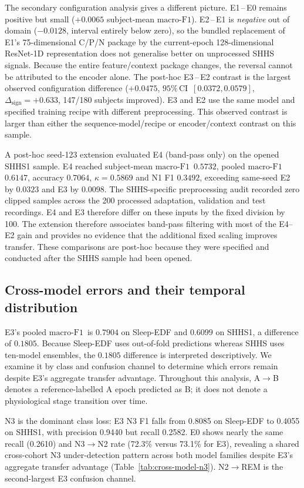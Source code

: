 \documentclass[11pt,a4paper]{article}
\newcommand{\mf}{\ensuremath{\mathrm{macro\text{-}F1}}}
\newcommand{\ci}{\ensuremath{95\%\,\mathrm{CI}}}
\newcommand{\dsign}{\ensuremath{\Delta_{\mathrm{sign}}}}
\begin{document}
The secondary configuration analysis gives a different picture. E1\,--\,E0 remains positive but small
($+0.0065$ subject-mean \mf). E2\,--\,E1 is \emph{negative} out of domain
($-0.0128$, interval entirely below zero),
so the bundled replacement of E1's 75-dimensional C/P/N package by the current-epoch 128-dimensional
ResNet-1D representation does not generalise better on unprocessed SHHS signals. Because the entire
feature/context package changes, the reversal cannot be attributed to the encoder alone. The
post-hoc E3\,--\,E2 contrast is the largest observed
configuration difference ($+0.0475$, \ci\ $[0.0372,0.0579]$, $\dsign = +0.633$, 147/180 subjects
improved). E3 and E2 use the same model and specified training recipe with different preprocessing.
This observed contrast is larger than either the sequence-model/recipe or encoder/context contrast
on this sample.

A post-hoc seed-123 extension evaluated E4 (band-pass only) on the opened SHHS1 sample. E4
reached subject-mean \mf\ $0.5732$, pooled \mf\ $0.6147$, accuracy $0.7064$, $\kappa = 0.5869$ and N1
F1 $0.3492$, exceeding same-seed E2 by $0.0323$ and E3 by $0.0098$. The SHHS-specific preprocessing
audit recorded zero clipped samples across the 200 processed adaptation, validation and test recordings.
E4 and E3 therefore differ on these inputs by the fixed division by 100.
The extension therefore associates band-pass filtering with most of the E4--E2 gain and provides no
evidence that the additional fixed scaling improves transfer. These comparisons are post-hoc because
they were specified and conducted after the SHHS sample had been opened.

\FloatBarrier
\subsection{Cross-model errors and their temporal distribution}
\label{sec:gap}

E3's pooled \mf\ is $0.7904$ on Sleep-EDF and $0.6099$ on SHHS1, a difference of $0.1805$.
Because Sleep-EDF uses out-of-fold predictions whereas SHHS uses ten-model ensembles, the $0.1805$
difference is interpreted descriptively. We examine it by class and confusion channel to
determine which errors remain despite E3's aggregate transfer advantage. Throughout this analysis,
A$\rightarrow$B denotes a reference-labelled A epoch predicted as B; it does not denote a physiological
stage transition over time.

N3 is the dominant class loss: E3 N3 F1 falls from 0.8085 on Sleep-EDF to 0.4055 on SHHS1, with
precision 0.9440 but recall 0.2582. E0 shows nearly the same recall (0.2610) and N3$\rightarrow$N2
rate (72.3\% versus 73.1\% for E3), revealing a shared cross-cohort N3 under-detection pattern across
both model families despite E3's aggregate transfer advantage (Table~\ref{tab:cross-model-n3}).
N2$\rightarrow$REM is the second-largest E3 confusion channel.
\end{document}
